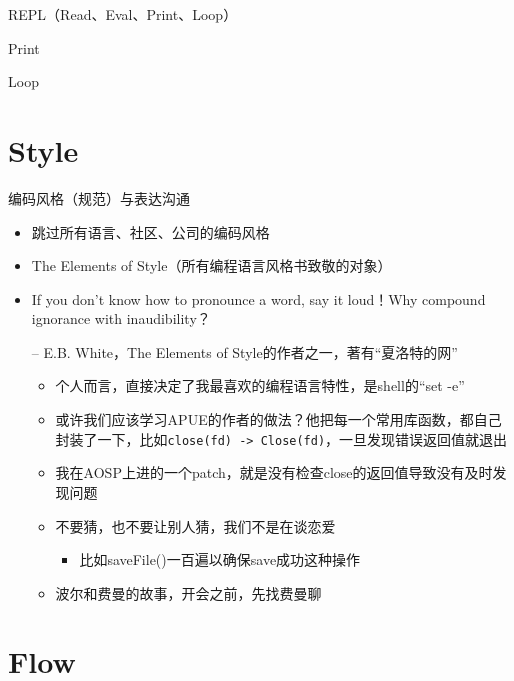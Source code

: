 \documentclass[presentation,dvipdfmx,CJKbookmarks]{beamer}
\begin{document}
\begin{CJK*}{UTF8}{simsun}
\begin{frame}[label={sec:org4d6b9fc}]{REPL（Read、Eval、Print、Loop）}
\begin{block}{Print}
\end{block}
\begin{block}{Loop}
\end{block}
\end{frame}

\section{Style}
\label{sec:org6640877}

\begin{frame}[fragile,label={sec:orgcc79dcf}]{编码风格（规范）与表达沟通}
 \begin{itemize}
\item 跳过所有语言、社区、公司的编码风格
\item The Elements of Style（所有编程语言风格书致敬的对象）
\item If you don't know how to pronounce a word, say it loud！Why compound ignorance with inaudibility？

-- E.B. White，The Elements of Style\thinspace 的作者之一，著有“夏洛特的网”

\begin{itemize}
\item 个人而言，直接决定了我最喜欢的编程语言特性，是\thinspace shell\thinspace 的“set -e”
\item 或许我们应该学习\thinspace APUE\thinspace 的作者的做法？他把每一个常用库函数，都自己封装了一下，比如\thinspace \texttt{close(fd) -> Close(fd)}，一旦发现错误返回值就退出
\item 我在\thinspace AOSP\thinspace 上进的一个\thinspace patch，就是没有检查\thinspace close\thinspace 的返回值导致没有及时发现问题
\item 不要猜，也不要让别人猜，我们不是在谈恋爱

\begin{itemize}
\item 比如\thinspace saveFile()\thinspace 一百遍以确保\thinspace save\thinspace 成功这种操作
\end{itemize}
\item 波尔和费曼的故事，开会之前，先找费曼聊
\end{itemize}
\end{itemize}
\end{frame}

\section{Flow}
\label{sec:org65deea5}


\end{CJK*}
\end{document}
